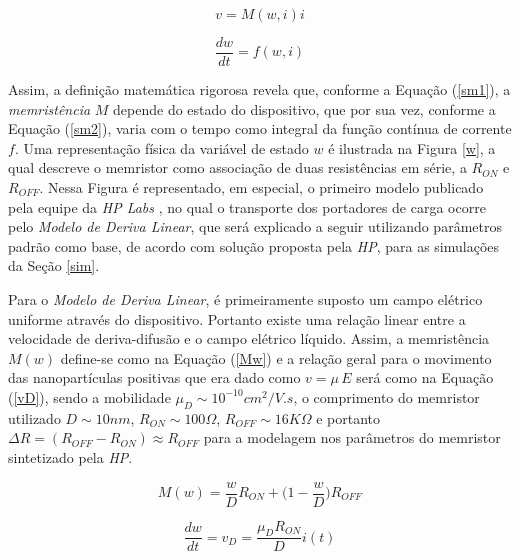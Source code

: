 \documentclass{ceel}
\begin{document}
\begin{multicols}{2}
\begin{equation}\label{sm1}
v=M(w, i)i
\end{equation}

\begin{equation}\label{sm2}
\dfrac{dw}{dt}=f(w, i)
\end{equation}
\vspace{0.05cm}

Assim, a definição matemática rigorosa revela que, conforme a Equação (\ref{sm1}), a \emph{memristência} $M$ depende do estado do dispositivo, que por sua vez, conforme a Equação (\ref{sm2}), varia com o tempo como integral da função contínua de corrente $f$. Uma representação física da variável de estado $w$ é ilustrada na Figura \ref{w}, a qual descreve o memristor como associação de duas resistências em série, a $R_{ON}$ e $R_{OFF}$. Nessa Figura é representado, em especial, o primeiro modelo publicado pela equipe da \emph{HP Labs} \cite{nature}, no qual o transporte dos portadores de carga ocorre pelo \emph{Modelo de Deriva Linear}, que será explicado a seguir utilizando parâmetros padrão como base, de acordo com solução proposta pela \emph{HP}, para as simulações da Seção \ref{sim}.

Para o \emph{Modelo de Deriva Linear}, é primeiramente suposto um campo elétrico uniforme através do dispositivo. Portanto existe uma relação linear entre a velocidade de deriva-difusão e o campo elétrico líquido. Assim, a memristência $M(w)$ define-se como na Equação (\ref{Mw}) e a relação geral para o movimento das nanopartículas positivas que era dado como $v=\mu\, E$ será como na Equação (\ref{vD}), sendo a mobilidade $\mu_D \sim 10^{-10} cm^2/V.s$, o comprimento do memristor utilizado $D\sim10nm$, $R_{ON}\sim 100\Omega$, $R_{OFF}\sim 16K\Omega$ e portanto $\Delta R = (R_{OFF} - R_{ON}) \approx R_{OFF}$ para a modelagem nos parâmetros do memristor sintetizado pela \emph{HP}.

\vspace{0.05cm}
\begin{equation}\label{Mw}
M(w)=\dfrac{w}{D}R_{ON}+\Big(1 - \dfrac{w}{D}\Big) R_{OFF}
\end{equation}

\begin{equation}\label{vD}
\dfrac{dw}{dt}=v_D=\dfrac{\mu_D R_{ON}}{D}i(t)
\end{equation}
\vspace{0.05cm}


\end{multicols}
\end{document}
